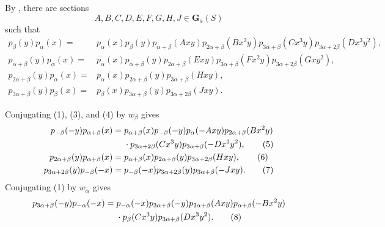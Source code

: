 By , there are sections
\[
  A,B,C,D,E,F,G,H,J\in\mathbf G_a(S)
\]
such that
\begin{align}
 p_\beta(y)p_\alpha(x)
  ={}&p_\alpha(x)p_\beta(y)p_{\alpha+\beta}(Axy)
     p_{2\alpha+\beta}(Bx^2y)p_{3\alpha+\beta}(Cx^3y)
     p_{3\alpha+2\beta}(Dx^3y^2), \tag{1}\label{sga3:XXIII:3.4:eq1}\\
 p_{\alpha+\beta}(y)p_\alpha(x)
  ={}&p_\alpha(x)p_{\alpha+\beta}(y)p_{2\alpha+\beta}(Exy)
     p_{3\alpha+\beta}(Fx^2y)p_{3\alpha+2\beta}(Gxy^2),
     \tag{2}\label{sga3:XXIII:3.4:eq2}\\
 p_{2\alpha+\beta}(y)p_\alpha(x)
  ={}&p_\alpha(x)p_{2\alpha+\beta}(y)p_{3\alpha+\beta}(Hxy),
     \tag{3}\label{sga3:XXIII:3.4:eq3}\\
 p_{3\alpha+\beta}(y)p_\beta(x)
  ={}&p_\beta(x)p_{3\alpha+\beta}(y)p_{3\alpha+2\beta}(Jxy).
     \tag{4}\label{sga3:XXIII:3.4:eq4}
\end{align}

Conjugating (1), (3), and (4) by \(w_\beta\) gives
\begin{align}
 p_{-\beta}(-y)p_{\alpha+\beta}(x)
  ={}&p_{\alpha+\beta}(x)p_{-\beta}(-y)p_\alpha(-Axy)
     p_{2\alpha+\beta}(Bx^2y)\notag\\
    &{}\cdot p_{3\alpha+2\beta}(Cx^3y)
     p_{3\alpha+\beta}(-Dx^3y^2), \tag{5}\label{sga3:XXIII:3.4:eq5}\\
 p_{2\alpha+\beta}(y)p_{\alpha+\beta}(x)
  ={}&p_{\alpha+\beta}(x)p_{2\alpha+\beta}(y)
     p_{3\alpha+2\beta}(Hxy), \tag{6}\label{sga3:XXIII:3.4:eq6}\\
 p_{3\alpha+2\beta}(y)p_{-\beta}(-x)
  ={}&p_{-\beta}(-x)p_{3\alpha+2\beta}(y)
     p_{3\alpha+\beta}(-Jxy). \tag{7}\label{sga3:XXIII:3.4:eq7}
\end{align}
Conjugating (1) by \(w_\alpha\) gives
\begin{align}
 p_{3\alpha+\beta}(-y)p_{-\alpha}(-x)
  ={}&p_{-\alpha}(-x)p_{3\alpha+\beta}(-y)
     p_{2\alpha+\beta}(Axy)p_{\alpha+\beta}(-Bx^2y)\notag\\
    &{}\cdot p_\beta(Cx^3y)p_{3\alpha+\beta}(Dx^3y^2).
     \tag{8}\label{sga3:XXIII:3.4:eq8}
\end{align}

